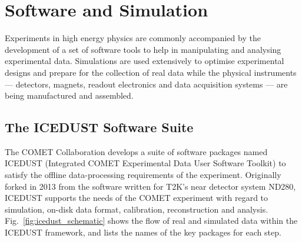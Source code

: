 \chapter{Software and Simulation}\label{chapter3}

\newcommand{\SimG}{\texttt{SimG4}\xspace}
\newcommand{\oaEvent}{\texttt{oaEvent}\xspace}
\newcommand{\Geant}{{\sc Geant4}\xspace}


 
    
    
    



Experiments in high energy physics are commonly accompanied by the development of a set of software tools to help in manipulating and analysing experimental data. Simulations are used extensively to optimise experimental designs and prepare for the collection of real data while the physical instruments --- detectors, magnets, readout electronics and data acquisition systems --- are being manufactured and assembled.

\section{The ICEDUST Software Suite}
The COMET Collaboration develops a suite of software packages named ICEDUST (Integrated COMET Experimental Data User Software Toolkit) to satisfy the offline data-processing requirements of the experiment. Originally forked in 2013 from the software written for T2K's near detector system ND280, ICEDUST supports the needs of the COMET experiment with regard to simulation, on-disk data format, calibration, reconstruction and analysis. Fig.~\ref{fig:icedust_schematic} shows the flow of real and simulated data within the ICEDUST framework, and lists the names of the key packages for each step.


